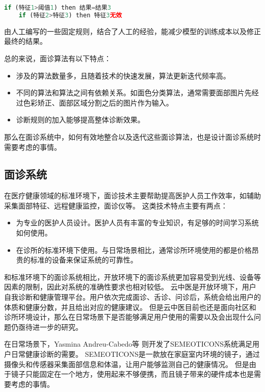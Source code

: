 \begin{lstlisting}[language={Python}, title=诊断规则]
    if (特征1>阈值1) then 结果=结果3
    if (特征2>特征3) then 特征3无效
\end{lstlisting}

由人工编写的一些固定规则，结合了人工的经验，能减少模型的训练成本以及修正最终的结果。

总的来说，面诊算法有以下特点：

\begin{itemize}
    \item 涉及的算法数量多，且随着技术的快速发展，算法更新迭代频率高。
    \item 不同的算法和算法之间有依赖关系。如面色分类算法，通常需要面部图片先经过色彩矫正、面部区域分割之后的图片作为输入。
    \item 诊断规则的加入能够提高整体诊断效果。
\end{itemize}

那么在面诊系统中，如何有效地整合以及迭代这些面诊算法，也是设计面诊系统时需要考虑的事情。


\subsection{面诊系统}

在医疗健康领域的标准环境下，面诊技术主要帮助提高医护人员工作效率，如辅助采集面部特征\cite{张红凯2015中医面诊信息采集与识别方法研究进展}、远程健康监控\cite{Hossain2015Cloud}，面诊仪\cite{邸丹2016手持式舌象仪的研制}等。
这类技术特点主要有两点：
\begin{itemize}
    \item 为专业的医护人员设计。医护人员有丰富的专业知识，有足够的时间学习系统如何使用。
    \item 在诊所的标准环境下使用。与日常场景相比，通常诊所环境使用的都是价格昂贵的标准的设备来保证系统的可靠性。
\end{itemize}


和标准环境下的面诊系统相比，开放环境下的面诊系统更加容易受到光线、设备等因素的限制，因此对系统的准确性要求也相对较低。
云中医\cite{李雪2016}是开放环境下，用户自我诊断和健康管理平台。用户依次完成面诊、舌诊、问诊后，系统会给出用户的体质和健康分数，并且给出对应的健康建议。
但是云中医目前也还是面向社区和诊所环境设计，那么在日常场景下是否能够满足用户使用的需要以及会出现什么问题仍亟待进一步的研究。

在日常场景下，Yasmina Andreu-Cabedo等 \cite{andreu2015mirror}则开发了SEMEOTICONS系统满足用户日常健康诊断的需要。
SEMEOTICONS是一款放在家庭室内环境的镜子，通过摄像头和传感器采集面部信息和体温，让用户能够监测自己的健康情况。
但是由于镜子只能固定在一个地方，使用起来不够便携，而且镜子带来的硬件成本也是需要考虑的事情。


